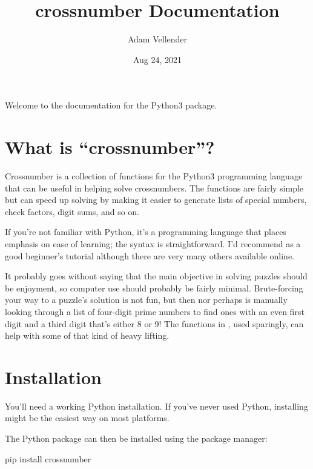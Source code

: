 \documentclass[letterpaper,10pt,english]{sphinxmanual}
\title{crossnumber Documentation}
\date{Aug 24, 2021}
\author{Adam Vellender}
\begin{document}
\pagestyle{empty}
\sphinxmaketitle
\pagestyle{plain}
\sphinxtableofcontents
\pagestyle{normal}
\label{\detokenize{index::doc}}


Welcome to the documentation for the  Python3 package.


\chapter{What is “crossnumber”?}
\label{\detokenize{index:what-is-crossnumber}}
Crossnumber is a collection of functions for the Python3 programming language that can be useful in helping solve crossnumbers. The functions are fairly simple but can speed up solving by making it easier to generate lists of special numbers, check factors, digit sums, and so on.

If you’re not familiar with Python, it’s a programming language that places emphasis on ease of learning; the syntax is straightforward. I’d recommend  as a good beginner’s tutorial although there are very many others available online.

It probably goes without saying that the main objective in solving puzzles should be enjoyment, so computer use should probably be fairly minimal. Brute-forcing your way to a puzzle’s solution is not fun, but then nor perhaps is manually looking through a list of four-digit prime numbers to find ones with an even first digit and a third digit that’s either 8 or 9! The functions in , used sparingly, can help with some of that kind of heavy lifting.


\chapter{Installation}
\label{\detokenize{index:installation}}
You’ll need a working Python installation. If you’ve never used Python, installing  might be the easiest way on most platforms.

The  Python package can then be installed using the  package manager:

\begin{sphinxVerbatim}[commandchars=\\\{\}]
pip install crossnumber
\end{sphinxVerbatim}
\end{document}
